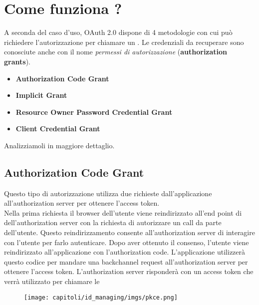 \section{Come funziona ?}

A seconda del caso d'uso, OAuth 2.0 dispone di 4 metodologie con cui può richiedere
l'autorizzazione per chiamare un \api{}. Le credenziali da recuperare sono conosciute
anche con il nome \textit{permessi di autorizzazione} (\textbf{authorization grants}).

\begin{itemize}
      \item \textbf{Authorization Code Grant}
      \item \textbf{Implicit Grant}
      \item \textbf{Resource Owner Password Credential Grant}
      \item \textbf{Client Credential Grant}
\end{itemize}

Analizziamoli in maggiore dettaglio.

\subsection{Authorization Code Grant}

Questo tipo di autorizzazione utilizza due richieste dall'applicazione all'authorization
server per ottenere l'access token.\\
Nella prima richiesta il browser dell'utente viene reindirizzato all'end point di
dell'authorization server con la richiesta di autorizzare un \api{} call da parte
dell'utente.
Questo reindirizzamento consente all'authorization server di interagire con l'utente
per farlo autenticare. Dopo aver ottenuto il consenso, l'utente viene reindirizzato
all'applicazione
con l'authorization code. L'applicazione utilizzerà questo codice per mandare una
backchannel request all'authorization server per ottenere l'access token.
L'authorization server risponderà con un access token che verrà utilizzato per
chiamare le \api{}

\begin{figure}[H]
      \centering
      \texttt{[image: capitoli/id\_managing/imgs/pkce.png]}
\end{figure}

